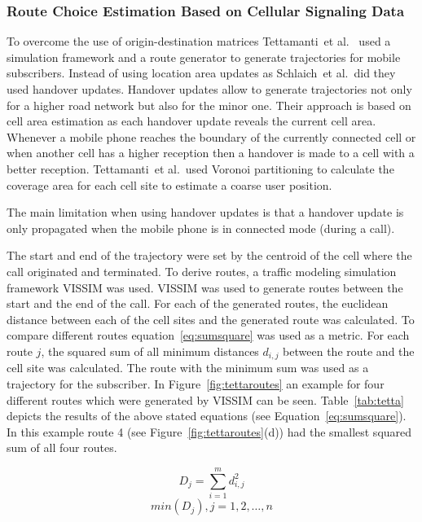 \subsubsection{Route Choice Estimation Based on Cellular Signaling Data}
To overcome the use of origin-destination matrices Tettamanti~et al.\ \cite{Tettamanti2012} used a simulation framework and a route generator to generate trajectories for mobile subscribers. Instead of using location area updates as Schlaich~et al.\ did they used handover updates. Handover updates allow to generate trajectories not only for a higher road network but also for the minor one. Their approach is based on cell area estimation as each handover update reveals the current cell area. Whenever a mobile phone reaches the boundary of the currently connected cell or when another cell has a higher reception then a handover is made to a cell with a better reception. Tettamanti~et al.\ used Voronoi partitioning to calculate the coverage area for each cell site to estimate a coarse user position.

The main limitation when using handover updates is that a handover update is only propagated when the mobile phone is in connected mode (during a call).

The start and end of the trajectory were set by the centroid of the cell where the call originated and terminated. To derive routes, a traffic modeling simulation framework VISSIM was used. VISSIM was used to generate routes between the start and the end of the call. For each of the generated routes, the euclidean distance between each of the cell sites and the generated route was calculated. To compare different routes equation~\ref{eq:sumsquare} was used  as a metric. For each route $j$, the squared sum of all minimum distances $d_{i,j}$ between the route and the cell site was calculated. The route with the minimum sum was used as a trajectory for the subscriber.
In Figure~\ref{fig:tettaroutes} an example for four different routes which were generated by VISSIM can be seen. Table~\ref{tab:tetta} depicts the results of the above stated equations (see Equation~\ref{eq:sumsquare}). In this example route 4 (see Figure~\ref{fig:tettaroutes}(d)) had the smallest squared sum of all four routes.

\begin{equation}
\label{eq:sumsquare}
D_j=\sum_{i=1}^{m} d_{i,j}^{2}
\end{equation}
\begin{equation}
\label{eq:minsum}
min(D_j), j = 1,2,\ldots,n
\end{equation}



